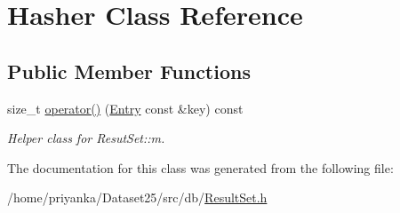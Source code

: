 \hypertarget{classHasher}{\section{\-Hasher \-Class \-Reference}
\label{classHasher}
}
\subsection*{\-Public \-Member \-Functions}
\begin{DoxyCompactItemize}
\item 
\hypertarget{classHasher_a6f581218408d8422c49b6109cc6197af}{size\-\_\-t \hyperlink{classHasher_a6f581218408d8422c49b6109cc6197af}{operator()} (\hyperlink{classEntry}{\-Entry} const \&key) const }\label{classHasher_a6f581218408d8422c49b6109cc6197af}

\begin{DoxyCompactList}\small\item\em \-Helper class for \-Resut\-Set\-::m. \end{DoxyCompactList}\end{DoxyCompactItemize}


\-The documentation for this class was generated from the following file\-:\begin{DoxyCompactItemize}
\item 
/home/priyanka/\-Dataset25/src/db/\hyperlink{ResultSet_8h}{\-Result\-Set.\-h}\end{DoxyCompactItemize}
